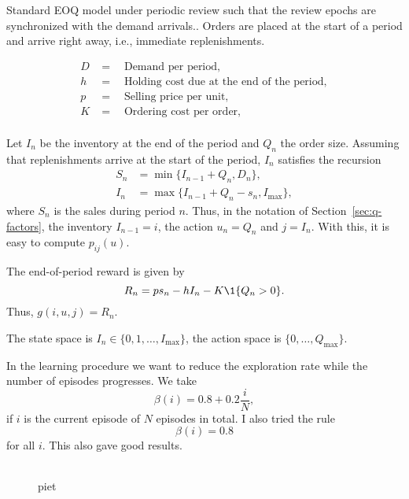 \documentclass{article}
\begin{document}
Standard EOQ model under periodic review such that the review epochs are synchronized with the demand arrivals.. Orders are placed at the
start of a period and arrive right away, i.e., immediate replenishments.

\begin{align*}
  D&= \quad \text{Demand per period},\\
  h&= \quad \text{Holding cost due at the end of the period},\\
  p&= \quad \text{Selling price per unit},\\
  K&= \quad \text{Ordering cost per order},\\
\end{align*}

Let $I_n$ be the inventory at the end of the period and $Q_n$ the order size. Assuming that replenishments arrive at the start of the period, $I_n$ satisfies the recursion
\begin{align*}
S_n&=\min\{I_{n-1} + Q_n, D_n\}, \\
I_n&=\max\{I_{n-1}+Q_n - s_n, I_{\max}\}, 
\end{align*}
where $S_n$ is the sales during period $n$.
Thus, in the notation of Section~\ref{sec:q-factors},  the inventory $I_{n-1}=i$, the action  
$u_n=Q_n$ and  $j=I_n$. With this, it is easy to compute $p_{ij}(u)$. 

The end-of-period reward is given by
\begin{equation*}
 R_n = p s_n - h I_n - K \1{Q_n > 0}.
\end{equation*}
Thus, $g(i,u, j) = R_n$.

The state space is  $I_n \in \{0, 1, \ldots, I_{\max}\}$, the action space is $\{0, \ldots, Q_{\max}\}$. 

In the learning procedure we want to reduce the exploration rate while the number of episodes progresses. We take
\begin{equation*}
  \beta(i) = 0.8 + 0.2\frac i N,
\end{equation*}
if $i$ is the current episode of $N$ episodes in total. I also tried the rule
\begin{equation*}
  \beta(i) = 0.8 
\end{equation*}
for all $i$. This also gave good results.


\begin{figure}[tb]
  \centering
  \begin{tabular}[h]{cc}
  \end{tabular}
  \caption{piet}
\end{figure}
\end{document}
